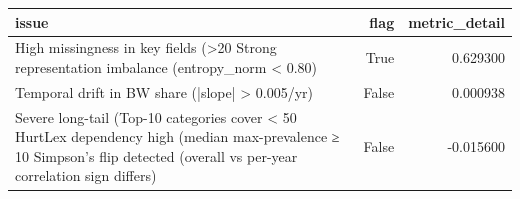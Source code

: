 \begin{tabular}{lrr}
\toprule
issue & flag & metric_detail \\
\midrule
High missingness in key fields (>20%
Strong representation imbalance (entropy_norm < 0.80) & True & 0.629300 \\
Temporal drift in BW share (|slope| > 0.005/yr) & False & 0.000938 \\
Severe long-tail (Top-10 categories cover < 50%
HurtLex dependency high (median max-prevalence ≥ 10%
Simpson’s flip detected (overall vs per-year correlation sign differs) & False & -0.015600 \\
\bottomrule
\end{tabular}

